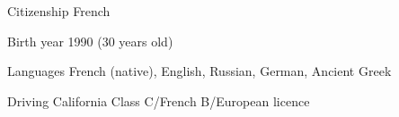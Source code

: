 
\begin{cvskills}

	\cvskill
	{Citizenship}
    {French}

	\cvskill
	{Birth year}
    {1990 (30 years old)}

	\cvskill
	{Languages}
    {French (native), English, Russian, German, Ancient Greek}

	\cvskill
	{Driving}
    {California Class C/French B/European licence}

\end{cvskills}
